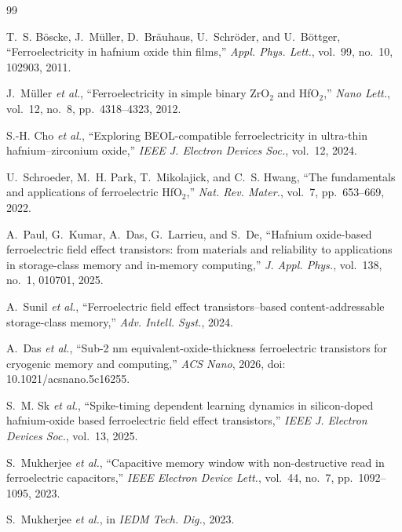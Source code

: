 \documentclass[journal]{IEEEtran}
\begin{document}
\begin{thebibliography}{99}
\itemsep 0pt

T.~S. B\"oscke, J.~M\"uller, D.~Br\"auhaus, U.~Schr\"oder, and U.~B\"ottger,
``Ferroelectricity in hafnium oxide thin films,''
\emph{Appl. Phys. Lett.}, vol.~99, no.~10, 102903, 2011.

J.~M\"uller \emph{et al.},
``Ferroelectricity in simple binary ZrO$_2$ and HfO$_2$,''
\emph{Nano Lett.}, vol.~12, no.~8, pp.~4318--4323, 2012.

S.-H. Cho \emph{et al.},
``Exploring BEOL-compatible ferroelectricity in ultra-thin hafnium--zirconium
oxide,'' \emph{IEEE J. Electron Devices Soc.}, vol.~12, 2024.

U.~Schroeder, M.~H. Park, T.~Mikolajick, and C.~S. Hwang,
``The fundamentals and applications of ferroelectric HfO$_2$,''
\emph{Nat. Rev. Mater.}, vol.~7, pp.~653--669, 2022.

A.~Paul, G.~Kumar, A.~Das, G.~Larrieu, and S.~De,
``Hafnium oxide-based ferroelectric field effect transistors: from materials
and reliability to applications in storage-class memory and in-memory
computing,'' \emph{J. Appl. Phys.}, vol.~138, no.~1, 010701, 2025.

A.~Sunil \emph{et al.},
``Ferroelectric field effect transistors--based content-addressable
storage-class memory,'' \emph{Adv. Intell. Syst.}, 2024.

A.~Das \emph{et al.},
``Sub-2 nm equivalent-oxide-thickness ferroelectric transistors for cryogenic
memory and computing,'' \emph{ACS Nano}, 2026,
doi: 10.1021/acsnano.5c16255.

S.~M. Sk \emph{et al.},
``Spike-timing dependent learning dynamics in silicon-doped hafnium-oxide
based ferroelectric field effect transistors,''
\emph{IEEE J. Electron Devices Soc.}, vol.~13, 2025.

S.~Mukherjee \emph{et al.},
``Capacitive memory window with non-destructive read in ferroelectric
capacitors,'' \emph{IEEE Electron Device Lett.}, vol.~44, no.~7,
pp.~1092--1095, 2023.

S.~Mukherjee \emph{et al.},
in \emph{IEDM Tech. Dig.}, 2023.


\end{thebibliography}
\end{document}
